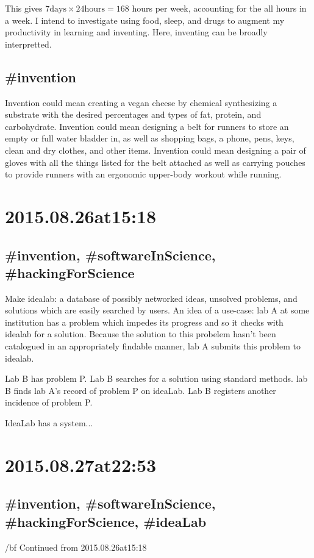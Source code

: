 This gives $7 \text{days} \times 24 \text{hours} = 168$ hours per week, accounting for the all hours in a week. I intend to investigate using food, sleep, and drugs to augment my productivity in learning and inventing. Here, inventing can be broadly interpretted.

\subsection*{\#invention}
Invention could mean creating a vegan cheese by chemical synthesizing a substrate with the desired percentages and types of fat, protein, and carbohydrate. Invention could mean designing a belt for runners to store an empty or full water bladder in, as well as shopping bags, a phone, pens, keys, clean and dry clothes, and other items. Invention could mean designing a pair of gloves with all the things listed for the belt attached as well as carrying pouches to provide runners with an ergonomic upper-body workout while running.

\section*{2015.08.26at15:18}
\subsection*{\#invention, \#softwareInScience, \#hackingForScience}
Make idealab: a database of possibly networked ideas, unsolved problems, and solutions which are easily searched by users. An idea of a use-case: lab A at some institution has a problem which impedes its progress and so it checks with idealab for a solution. Because the solution to this probelem hasn't been catalogued in an appropriately findable manner, lab A submits this problem to idealab.

Lab B has problem P. Lab B searches for a solution using standard methods. lab B finds lab A's record of problem P on ideaLab. Lab B registers another incidence of problem P.

IdeaLab has a system...

\section*{2015.08.27at22:53}
\subsection*{\#invention, \#softwareInScience, \#hackingForScience, \#ideaLab}
{/bf Continued from 2015.08.26at15:18}

